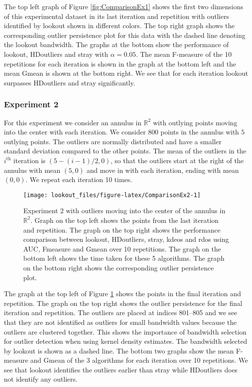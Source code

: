 \documentclass[
]{article}
\begin{document}
The top left graph of Figure \ref{fig:ComparisonEx1} shows the first two
dimensions of this experimental dataset in its last iteration and
repetition with outliers identified by lookout shown in different
colors. The top right graph shows the corresponding outlier persistence
plot for this data with the dashed line denoting the lookout bandwidth.
The graphs at the bottom show the performance of lookout, HDoutliers and
stray with \(\alpha = 0.05\). The mean F-measure of the 10 repetitions
for each iteration is shown in the graph at the bottom left and the mean
Gmean is shown at the bottom right. We see that for each iteration
lookout surpasses HDoutliers and stray significantly.

\hypertarget{experiment-2}{%
\subsubsection*{Experiment 2}\label{experiment-2}}

For this experiment we consider an annulus in \(\mathbb{R}^2\) with
outlying points moving into the center with each iteration. We consider
\(800\) points in the annulus with \(5\) outlying points. The outliers
are normally distributed and have a smaller standard deviation compared
to the other points. The mean of the outliers in the \(i^{\text{th}}\)
iteration is \(\left( 5 - (i-1) /2, 0 \right)\), so that the outliers
start at the right of the annulus with mean \((5,0)\) and move in with
each iteration, ending with mean \((0,0)\). We repeat each iteration 10
times.

\begin{figure}
\texttt{[image: lookout\_files/figure-latex/ComparisonEx2-1]} \caption{Experiment 2 with outliers moving into the center of the annulus in $\mathbb{R}^2$. Graph on the top left shows the points from the last iteration and repetition. The graph on the top right shows the performance comparison between lookout, HDoutliers, stray, kdeos and rdos using AUC, Fmeasure and Gmean over 10 repetitions. The graph on the bottom left shows the time taken for these 5 algorithms. The graph on the bottom right shows the corresponding outlier persistence plot.}\label{fig:ComparisonEx2}
\end{figure}

The graph at the top left of Figure \ref{fig:ComparisonEx2} shows the
points in the final iteration and repetition. The graph on the top right
shows the outlier persistence for the final iteration and repetition.
The outliers are placed at indices 801--805 and we see that they are not
identified as outliers for small bandwidth values because the outliers
are clustered together. This shows the importance of bandwidth selection
for outlier detection when using kernel density estimates. The bandwidth
selected by lookout is shown as a dashed line. The bottom two graphs
show the mean F-measure and Gmean of the 3 algorithms for each iteration
over 10 repetitions. We see that lookout identifies the outliers earlier
than stray while HDoutliers does not identify any outliers.
\end{document}
